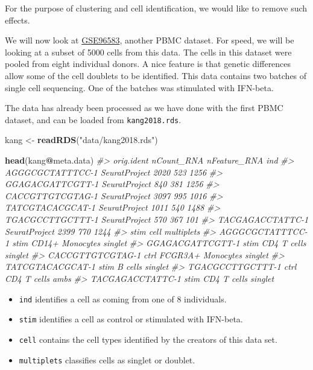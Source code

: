 \documentclass[
]{book}
\newenvironment{Shaded}{\begin{snugshade}}{\end{snugshade}}
\newcommand{\CommentTok}[1]{\textcolor[rgb]{0.56,0.35,0.01}{\textit{#1}}}
\newcommand{\FunctionTok}[1]{\textcolor[rgb]{0.13,0.29,0.53}{\textbf{#1}}}
\newcommand{\NormalTok}[1]{#1}
\newcommand{\OtherTok}[1]{\textcolor[rgb]{0.56,0.35,0.01}{#1}}
\newcommand{\SpecialCharTok}[1]{\textcolor[rgb]{0.81,0.36,0.00}{\textbf{#1}}}
\newcommand{\StringTok}[1]{\textcolor[rgb]{0.31,0.60,0.02}{#1}}
\providecommand{\tightlist}{%
  \setlength{\itemsep}{0pt}\setlength{\parskip}{0pt}}
\begin{document}
For the purpose of clustering and cell identification, we would like to remove such effects.

We will now look at \href{https://www.ncbi.nlm.nih.gov/geo/query/acc.cgi?acc=GSE96583}{GSE96583}, another PBMC dataset. For speed, we will be looking at a subset of 5000 cells from this data. The cells in this dataset were pooled from eight individual donors. A nice feature is that genetic differences allow some of the cell doublets to be identified. This data contains two batches of single cell sequencing. One of the batches was stimulated with IFN-beta.

The data has already been processed as we have done with the first PBMC dataset, and can be loaded from \texttt{kang2018.rds}.

\begin{Shaded}
\begin{Highlighting}[]
\NormalTok{kang }\OtherTok{\textless{}{-}} \FunctionTok{readRDS}\NormalTok{(}\StringTok{"data/kang2018.rds"}\NormalTok{)}

\FunctionTok{head}\NormalTok{(kang}\SpecialCharTok{@}\NormalTok{meta.data)}
\CommentTok{\#\textgreater{}                     orig.ident nCount\_RNA nFeature\_RNA  ind}
\CommentTok{\#\textgreater{} AGGGCGCTATTTCC{-}1 SeuratProject       2020          523 1256}
\CommentTok{\#\textgreater{} GGAGACGATTCGTT{-}1 SeuratProject        840          381 1256}
\CommentTok{\#\textgreater{} CACCGTTGTCGTAG{-}1 SeuratProject       3097          995 1016}
\CommentTok{\#\textgreater{} TATCGTACACGCAT{-}1 SeuratProject       1011          540 1488}
\CommentTok{\#\textgreater{} TGACGCCTTGCTTT{-}1 SeuratProject        570          367  101}
\CommentTok{\#\textgreater{} TACGAGACCTATTC{-}1 SeuratProject       2399          770 1244}
\CommentTok{\#\textgreater{}                  stim              cell multiplets}
\CommentTok{\#\textgreater{} AGGGCGCTATTTCC{-}1 stim   CD14+ Monocytes    singlet}
\CommentTok{\#\textgreater{} GGAGACGATTCGTT{-}1 stim       CD4 T cells    singlet}
\CommentTok{\#\textgreater{} CACCGTTGTCGTAG{-}1 ctrl FCGR3A+ Monocytes    singlet}
\CommentTok{\#\textgreater{} TATCGTACACGCAT{-}1 stim           B cells    singlet}
\CommentTok{\#\textgreater{} TGACGCCTTGCTTT{-}1 ctrl       CD4 T cells       ambs}
\CommentTok{\#\textgreater{} TACGAGACCTATTC{-}1 stim       CD4 T cells    singlet}
\end{Highlighting}
\end{Shaded}

\begin{itemize}
\tightlist
\item
  \texttt{ind} identifies a cell as coming from one of 8 individuals.
\item
  \texttt{stim} identifies a cell as control or stimulated with IFN-beta.
\item
  \texttt{cell} contains the cell types identified by the creators of this data set.
\item
  \texttt{multiplets} classifies cells as singlet or doublet.
\end{itemize}
\end{document}
